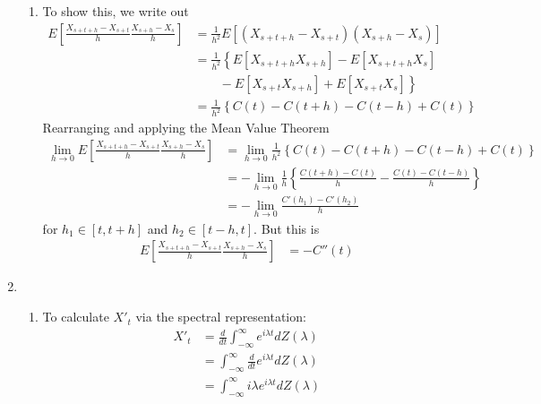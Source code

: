 \documentclass[12pt]{article}
\theoremstyle{plain}
\theoremstyle{definition}
\theoremstyle{remark}
\begin{document}
\begin{enumerate}
\begin{enumerate}
    \item %
      To show this, we write out
      \begin{align*}
        E\left[ \frac{X_{s+t+h}-X_{s+t}}{h} \frac{X_{s+h}-X_s}{h}\right]
        &= \frac{1}{h^2}
        E\left[ (X_{s+t+h}-X_{s+t}) (X_{s+h}-X_s)\right]\\
        &= \frac{1}{h^2}\left\{
        E[ X_{s+t+h} X_{s+h}] -E[X_{s+t+h} X_s ] \right. \\
        &\left. \qquad -E[X_{s+t} X_{s+h}]+ E[X_{s+t}X_{s}]
        \right\}\\
        &= \frac{1}{h^2}\left\{ C(t) -C(t+h) -C(t-h)+ C(t) \right\}
      \end{align*}
      Rearranging and applying the Mean Value Theorem
      \begin{align*}
        \lim_{h\rightarrow 0}
        E\left[ \frac{X_{s+t+h}-X_{s+t}}{h} \frac{X_{s+h}-X_s}{h}\right]
        &= \lim_{h\rightarrow 0}
          \frac{1}{h^2}\left\{ C(t) -C(t+h) -C(t-h)+ C(t) \right\}\\
        &= -\lim_{h\rightarrow 0}
          \frac{1}{h}\left\{ \frac{C(t+h) -C(t)}{h} -\frac{C(t) -C(t-h)}{h} \right\}\\
        &= -\lim_{h\rightarrow 0}
          \frac{C'(h_1) - C'(h_2)}{h}
      \end{align*}
      for $h_1 \in [t,t+h]$ and $h_2\in [t-h,t]$. But this is
      \begin{align*}
        E\left[ \frac{X_{s+t+h}-X_{s+t}}{h} \frac{X_{s+h}-X_s}{h}\right]
        &= -C''(t)
      \end{align*}
  \end{enumerate}

  \item %
    \begin{enumerate}
      \item %
        To calculate $X'_t$ via the spectral representation:
        \begin{align*}
          X'_t
            &=  \frac{d}{dt} \int^\infty_{-\infty} e^{i\lambda t} dZ(\lambda)\\
            &=  \int^\infty_{-\infty} \frac{d}{dt} e^{i\lambda t} dZ(\lambda)\\
            &=  \int^\infty_{-\infty} i\lambda e^{i\lambda t} dZ(\lambda)
        \end{align*}


\end{enumerate}
\end{enumerate}
\end{document}
